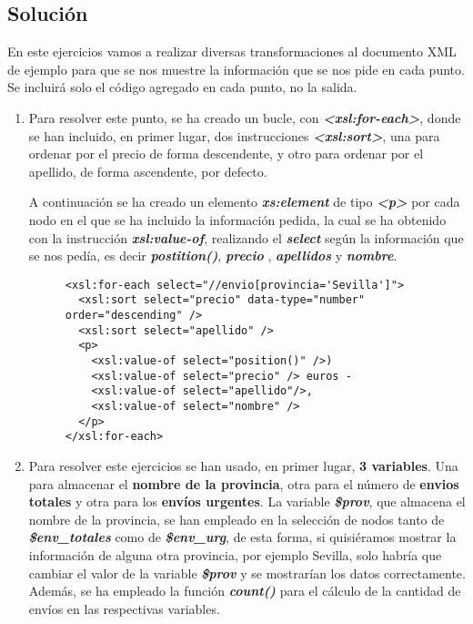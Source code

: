 \subsection{Solución}
En este ejercicios vamos a realizar diversas transformaciones al documento XML de ejemplo para que se nos muestre la información que se nos pide en cada punto. Se incluirá solo el código agregado en cada punto, no la salida.

\begin{enumerate}[label=\Alph*.]
    \item Para resolver este punto, se ha creado un bucle, con \textbf{\textit{<xsl:for-each>}}, donde se han incluido, en primer lugar, dos instrucciones \textbf{\textit{<xsl:sort>}}, una para ordenar por el precio de forma descendente, y otro para ordenar por el apellido, de forma ascendente, por defecto.

    A continuación se ha creado un elemento \textbf{\textit{xs:element}} de tipo \textbf{\textit{<p>}} por cada nodo en el que se ha incluido la información pedida, la cual se ha obtenido con la instrucción \textbf{\textit{xsl:value-of}}, realizando el \textbf{\textit{select}} según la información que se nos pedía, es decir \textbf{\textit{postition()}}, \textbf{\textit{precio}} , \textbf{\textit{apellidos}} y \textbf{\textit{nombre}}.

    \begin{figure}[H]
        \begin{tcolorbox}[sharp corners, colback=yellow!30, colframe=white!20]
            \scriptsize
\begin{verbatim}
<xsl:for-each select="//envio[provincia='Sevilla']">
  <xsl:sort select="precio" data-type="number" order="descending" />
  <xsl:sort select="apellido" />
  <p>
    <xsl:value-of select="position()" />)
    <xsl:value-of select="precio" /> euros -
    <xsl:value-of select="apellido"/>,
    <xsl:value-of select="nombre" />
  </p>
</xsl:for-each>
\end{verbatim}
        \end{tcolorbox}
    \end{figure}

    \item Para resolver este ejercicios se han usado, en primer lugar, \textbf{3 variables}. Una para almacenar
    el \textbf{nombre de la provincia}, otra para el número de \textbf{envios totales} y otra para los \textbf{envíos urgentes}. La variable \textbf{\textit{\$prov}}, que almacena el nombre de la provincia, se han empleado en la
    selección de nodos tanto de \textbf{\textit{\$env\_totales}} como de \textbf{\textit{\$env\_urg}}, de esta forma,
    si quisiéramos mostrar la información de alguna otra provincia, por ejemplo Sevilla, solo habría que cambiar el valor de la variable \textbf{\textit{\$prov}} y se mostrarían los datos correctamente. Además, se ha empleado la función \textbf{\textit{count()}} para el cálculo de la cantidad de envíos en las respectivas variables.


\end{enumerate}

